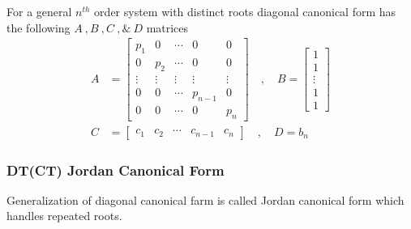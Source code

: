 \documentclass[twoside]{article}
\begin{document}
For a general $n^{th}$ order system with distinct
roots diagonal canonical form has the following 
$A \ ,  B \ ,  C \ , \& \ D$ matrices
%
\begin{align*}
A &= \left[ \begin{array}{ccccc} p_1 & 0 & \cdots & 0 & 0
              \\ 0 & p_2 & \cdots & 0 & 0
\\ \vdots & \vdots & \vdots & \vdots & \vdots
\\ 0 & 0 & \cdots & p_{n-1} & 0
    \\ 0 & 0 & \cdots & 0 & p_n \end{array} \right]
\quad , \quad 
B = \left[ \begin{array}{c} 1 \\ 1 \\ \vdots \\ 1 \\  1
\end{array} \right]
\\ C &= \left[ \begin{array}{ccccc} c_1 & c_2 & \cdots &  c_{n-1} & c_n \end{array} \right]
\quad , \quad
D = b_n
\end{align*}


\subsubsection*{DT(CT) Jordan Canonical Form}

Generalization of diagonal canonical
farm is called Jordan canonical form
which handles repeated roots.
\end{document}

